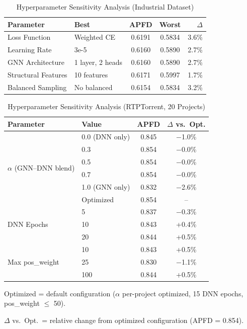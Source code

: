 \documentclass[10pt,journal,compsoc]{IEEEtran}
\begin{document}
\begin{table}[!t]
\centering
\caption{Hyperparameter Sensitivity Analysis (Industrial Dataset)}
\label{tab:sensitivity}
\scriptsize
\begin{tabular}{llccr}
\toprule
\textbf{Parameter} & \textbf{Best} & \textbf{APFD} & \textbf{Worst} & \textbf{$\Delta$} \\
\midrule
Loss Function & Weighted CE & 0.6191 & 0.5834 & 3.6\% \\
Learning Rate & 3e-5 & 0.6160 & 0.5890 & 2.7\% \\
GNN Architecture & 1 layer, 2 heads & 0.6160 & 0.5890 & 2.7\% \\
Structural Features & 10 features & 0.6171 & 0.5997 & 1.7\% \\
Balanced Sampling & No balanced & 0.6154 & 0.5834 & 3.2\% \\
\bottomrule
\end{tabular}
\end{table}

\begin{table}[!t]
\centering
\caption{Hyperparameter Sensitivity Analysis (RTPTorrent, 20 Projects)}
\label{tab:sensitivity_rtptorrent}
\footnotesize
\begin{threeparttable}
\begin{tabular}{llcc}
\toprule
\textbf{Parameter} & \textbf{Value} & \textbf{APFD} & \textbf{$\Delta$ vs.\ Opt.} \\
\midrule
\multirow{6}{*}{$\alpha$ (GNN--DNN blend)} & 0.0 (DNN only) & 0.845 & $-$1.0\% \\
 & 0.3 & 0.854 & $-$0.0\% \\
 & 0.5 & 0.854 & $-$0.0\% \\
 & 0.7 & 0.854 & $-$0.0\% \\
 & 1.0 (GNN only) & 0.832 & $-$2.6\% \\
 & Optimized & 0.854 & -- \\
\midrule
\multirow{3}{*}{DNN Epochs} & 5 & 0.837 & $-$0.3\% \\
 & 10 & 0.843 & +0.4\% \\
 & 20 & 0.844 & +0.5\% \\
\midrule
\multirow{3}{*}{Max pos\_weight} & 10 & 0.843 & +0.5\% \\
 & 25 & 0.830 & $-$1.1\% \\
 & 100 & 0.844 & +0.5\% \\
\bottomrule
\end{tabular}
\begin{tablenotes}
\small
\item Optimized = default configuration ($\alpha$ per-project optimized, 15 DNN epochs, pos\_weight $\leq$ 50).
\item $\Delta$ vs.\ Opt.\ = relative change from optimized configuration (APFD = 0.854).
\end{tablenotes}
\end{threeparttable}
\end{table}
\end{document}
